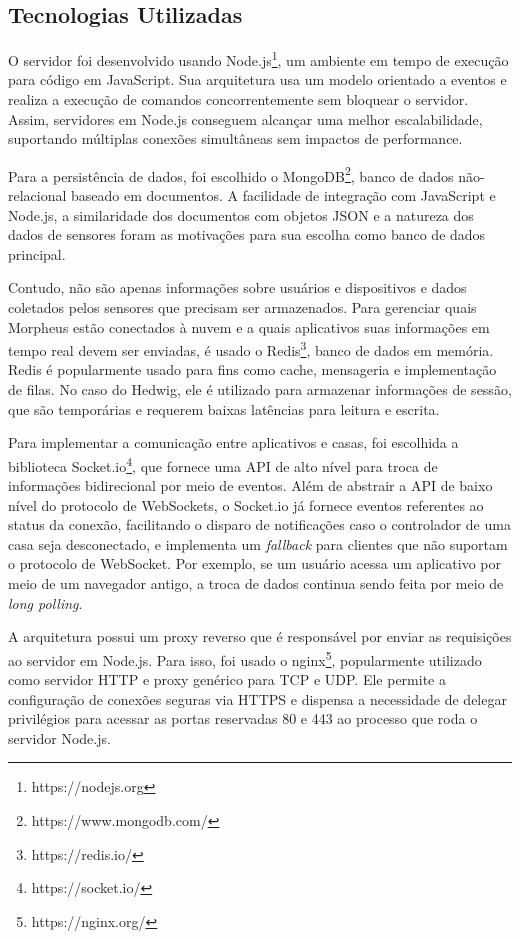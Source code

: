 \subsection{Tecnologias Utilizadas}

O servidor foi desenvolvido usando Node.js\footnote{https://nodejs.org}, um ambiente em tempo de execução para código em JavaScript. Sua arquitetura usa um modelo orientado a eventos e realiza a execução de comandos concorrentemente sem bloquear o servidor. Assim, servidores em Node.js conseguem alcançar uma melhor escalabilidade, suportando múltiplas conexões simultâneas sem impactos de performance.

Para a persistência de dados, foi escolhido o MongoDB\footnote{https://www.mongodb.com/}, banco de dados não-relacional baseado em documentos. A facilidade de integração com JavaScript e Node.js, a similaridade dos documentos com objetos JSON e a natureza dos dados de sensores foram as motivações para sua escolha como banco de dados principal.

Contudo, não são apenas informações sobre usuários e dispositivos e dados coletados pelos sensores que precisam ser armazenados. Para gerenciar quais Morpheus estão conectados à nuvem e a quais aplicativos suas informações em tempo real devem ser enviadas, é usado o Redis\footnote{https://redis.io/}, banco de dados em memória. Redis é popularmente usado para fins como cache, mensageria e implementação de filas. No caso do Hedwig, ele é utilizado para armazenar informações de sessão, que são temporárias e requerem baixas latências para leitura e escrita.

Para implementar a comunicação entre aplicativos e casas, foi escolhida a biblioteca Socket.io\footnote{https://socket.io/}, que fornece uma API de alto nível para troca de informações bidirecional por meio de eventos. Além de abstrair a API de baixo nível do protocolo de WebSockets, o Socket.io já fornece eventos referentes ao status da conexão, facilitando o disparo de notificações caso o controlador de uma casa seja desconectado, e implementa um \emph{fallback} para clientes que não suportam o protocolo de WebSocket. Por exemplo, se um usuário acessa um aplicativo por meio de um navegador antigo, a troca de dados continua sendo feita por meio de \emph{long polling}.

A arquitetura possui um proxy reverso que é responsável por enviar as requisições ao servidor em Node.js. Para isso, foi usado o nginx\footnote{https://nginx.org/}, popularmente utilizado como servidor HTTP e proxy genérico para TCP e UDP. Ele permite a configuração de conexões seguras via HTTPS e dispensa a necessidade de delegar privilégios para acessar as portas reservadas 80 e 443 ao processo que roda o servidor Node.js.

